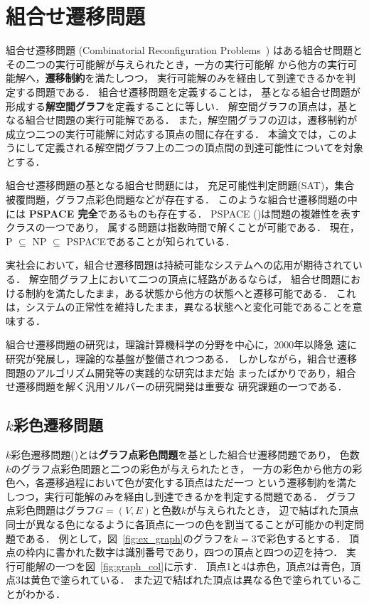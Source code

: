 \section{組合せ遷移問題} \label{chap:background}
組合せ遷移問題 (Combinatorial Reconfiguration Problems~\cite{Ito18:tohoku})
はある組合せ問題とその二つの実行可能解が与えられたとき，一方の実行可能解
から他方の実行可能解へ，\textbf{遷移制約}を満たしつつ，
実行可能解のみを経由して到達できるかを判定する問題である．
組合せ遷移問題を定義することは，
基となる組合せ問題が形成する\textbf{解空間グラフ}を定義することに等しい．
解空間グラフの頂点は，基となる組合せ問題の実行可能解である． 
また，解空間グラフの辺は，遷移制約が成立つ二つの実行可能解に対応する頂点の間に存在する．
本論文では，このようにして定義される解空間グラフ上の二つの頂点間の到達可能性についてを対象とする．

組合せ遷移問題の基となる組合せ問題には，
充足可能性判定問題(SAT)，集合被覆問題，グラフ点彩色問題などが存在する．
このような組合せ遷移問題の中には \textbf{PSPACE 完全}であるものも存在する． 
PSPACE (\cite{Kuriyama13:ieice})は問題の複雑性を表すクラスの一つであり，
属する問題は指数時間で解くことが可能である． 
現在，P $\subseteq$ NP $\subseteq$ PSPACEであることが知られている．

実社会において，組合せ遷移問題は持続可能なシステムへの応用が期待されている． 
解空間グラフ上において二つの頂点に経路があるならば，
組合せ問題における制約を満たしたまま，ある状態から他方の状態へと遷移可能である． 
これは，システムの正常性を維持したまま，異なる状態へと変化可能であることを意味する．

組合せ遷移問題の研究は，理論計算機科学の分野を中心に，2000年以降急
速に研究が発展し，理論的な基盤が整備されつつある．
しかしながら，組合せ遷移問題のアルゴリズム開発等の実践的な研究はまだ始
まったばかりであり，組合せ遷移問題を解く汎用ソルバーの研究開発は重要な
研究課題の一つである．

\subsection{$k$彩色遷移問題}
$k$彩色遷移問題(\cite{BC2009:tcs})とは\textbf{グラフ点彩色問題}を基とした組合せ遷移問題であり， 
色数$k$のグラフ点彩色問題と二つの彩色が与えられたとき，
一方の彩色から他方の彩色へ，各遷移過程において色が変化する頂点はただ一つ
という遷移制約を満たしつつ，実行可能解のみを経由し到達できるかを判定する問題である．
グラフ点彩色問題はグラフ$G=(V, E)$と色数$k$が与えられたとき，
辺で結ばれた頂点同士が異なる色になるように各頂点に一つの色を割当てることが可能かの判定問題である． 
例として，図~\ref{fig:ex_graph}のグラフを$k=3$で彩色するとする．
頂点の枠内に書かれた数字は識別番号であり，四つの頂点と四つの辺を持つ．
実行可能解の一つを図~\ref{fig:graph_col}に示す．
頂点1と4は赤色，頂点2は青色，頂点3は黄色で塗られている．
また辺で結ばれた頂点は異なる色で塗られていることがわかる．

